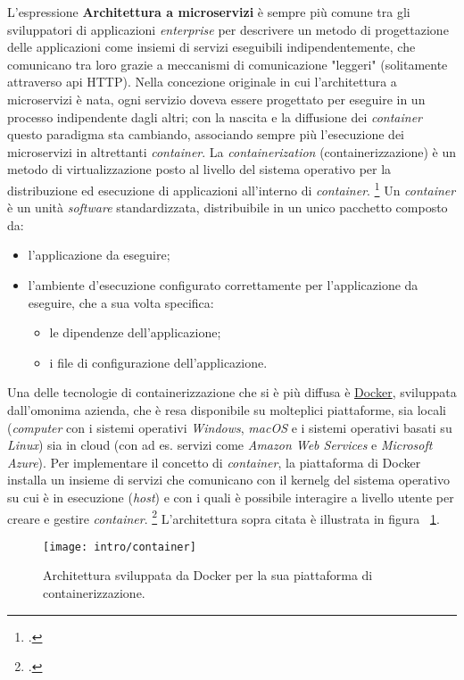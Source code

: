 L'espressione \textbf{Architettura a microservizi} è sempre più comune tra gli sviluppatori di applicazioni \textit{enterprise} per descrivere un metodo di progettazione delle applicazioni come insiemi di servizi eseguibili indipendentemente, che comunicano tra loro grazie a meccanismi di comunicazione "leggeri" (solitamente attraverso \gls{api} HTTP).
Nella concezione originale in cui l'architettura a microservizi è nata, ogni servizio doveva essere progettato per eseguire in un processo indipendente dagli altri; con la nascita e la diffusione dei \emph{container} questo paradigma sta cambiando, associando sempre più l'esecuzione dei microservizi in altrettanti \emph{container}.
La \emph{containerization} (containerizzazione) è un metodo di virtualizzazione posto al livello del sistema operativo per la distribuzione ed esecuzione di applicazioni all'interno di \emph{container}.
\footcite{site:containerization}
Un \emph{container} è un unità \emph{software} standardizzata, distribuibile in un unico pacchetto composto da:
\begin{itemize}
  \itemsep0em
  \item l'applicazione da eseguire;
  \item l'ambiente d'esecuzione configurato correttamente per l'applicazione da eseguire, che a sua volta specifica:
  \begin{itemize}
    \item le dipendenze dell'applicazione;
    \item i file di configurazione dell'applicazione.
  \end{itemize}
\end{itemize}
Una delle tecnologie di containerizzazione che si è più diffusa è \href{https://www.docker.com/what-docker}{Docker}, sviluppata dall'omonima azienda, che è resa disponibile su molteplici piattaforme, sia locali (\emph{computer} con i sistemi operativi \emph{Windows}, \emph{macOS} e i sistemi operativi basati su \emph{Linux}) sia in cloud (con ad es. servizi come \emph{Amazon Web Services} e \emph{Microsoft Azure}).
Per implementare il concetto di \emph{container}, la piattaforma di Docker installa un insieme di servizi che comunicano con il \gls{kernelg} del sistema operativo su cui è in esecuzione (\emph{host}) e con i quali è possibile interagire a livello utente per creare e gestire \emph{container}.
\footcite{site:docker-container}
L'architettura sopra citata è illustrata in figura ~\ref{fig:docker-arch}.

\begin{figure}[H]
    \centering
    \texttt{[image: intro/container]}
    \caption{Architettura sviluppata da Docker per la sua piattaforma di containerizzazione.\\ \cite{site:docker-container}}
    \label{fig:docker-arch}
\end{figure}

